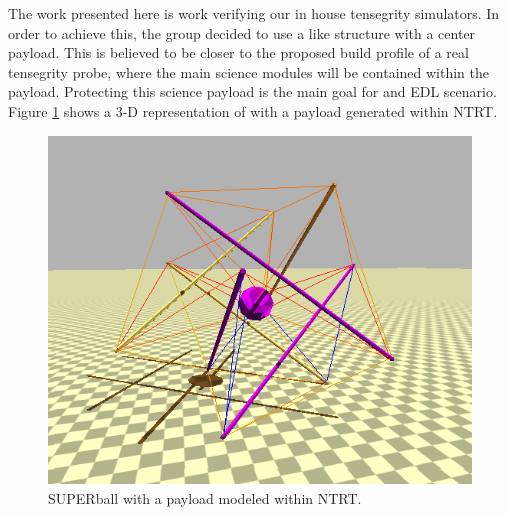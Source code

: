 The work presented here is work verifying our in house tensegrity simulators.
In order to achieve this, the group decided to use a \SB{} like structure with a center payload.
This is believed to be closer to the proposed build profile of a real tensegrity probe, where the main science modules will be contained within the payload.
Protecting this science payload is the main goal for and EDL scenario.
Figure \ref{fig:NTRT_SB} shows a 3-D representation of \SB{} with a payload generated within NTRT.

\begin{figure}[thpb]
      \centering
      \includegraphics[width=0.8\columnwidth]{tex/img/1.png}
      \caption{SUPERball with a payload modeled within NTRT.}
      \label{fig:NTRT_SB}
\end{figure}

